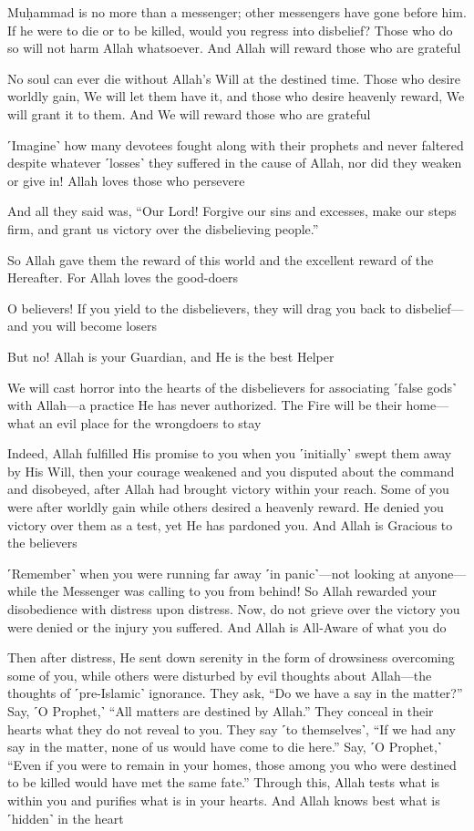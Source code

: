 Muḥammad is no more than a messenger; other messengers have gone before him. If he were to die or to be killed, would you regress into disbelief? Those who do so will not harm Allah whatsoever. And Allah will reward those who are grateful

No soul can ever die without Allah’s Will at the destined time. Those who desire worldly gain, We will let them have it, and those who desire heavenly reward, We will grant it to them. And We will reward those who are grateful

˹Imagine˺ how many devotees fought along with their prophets and never faltered despite whatever ˹losses˺ they suffered in the cause of Allah, nor did they weaken or give in! Allah loves those who persevere

And all they said was, “Our Lord! Forgive our sins and excesses, make our steps firm, and grant us victory over the disbelieving people.”

So Allah gave them the reward of this world and the excellent reward of the Hereafter. For Allah loves the good-doers

O believers! If you yield to the disbelievers, they will drag you back to disbelief—and you will become losers

But no! Allah is your Guardian, and He is the best Helper

We will cast horror into the hearts of the disbelievers for associating ˹false gods˺ with Allah—a practice He has never authorized. The Fire will be their home—what an evil place for the wrongdoers to stay

Indeed, Allah fulfilled His promise to you when you ˹initially˺ swept them away by His Will, then your courage weakened and you disputed about the command and disobeyed, after Allah had brought victory within your reach. Some of you were after worldly gain while others desired a heavenly reward. He denied you victory over them as a test, yet He has pardoned you. And Allah is Gracious to the believers

˹Remember˺ when you were running far away ˹in panic˺—not looking at anyone—while the Messenger was calling to you from behind! So Allah rewarded your disobedience with distress upon distress. Now, do not grieve over the victory you were denied or the injury you suffered. And Allah is All-Aware of what you do

Then after distress, He sent down serenity in the form of drowsiness overcoming some of you, while others were disturbed by evil thoughts about Allah—the thoughts of ˹pre-Islamic˺ ignorance. They ask, “Do we have a say in the matter?” Say, ˹O Prophet,˺ “All matters are destined by Allah.” They conceal in their hearts what they do not reveal to you. They say ˹to themselves˺, “If we had any say in the matter, none of us would have come to die here.” Say, ˹O Prophet,˺ “Even if you were to remain in your homes, those among you who were destined to be killed would have met the same fate.” Through this, Allah tests what is within you and purifies what is in your hearts. And Allah knows best what is ˹hidden˺ in the heart

